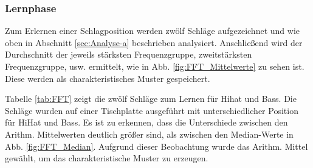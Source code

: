 \subsubsection{Lernphase}
\label{sec:Lernphase}
Zum Erlernen einer Schlagposition werden zwölf Schläge aufgezeichnet und wie oben in Abschnitt \ref{sec:Analyse-a} beschrieben analysiert.
Anschließend wird der Durchschnitt der jeweils stärksten Frequenzgruppe, zweitstärksten Frequenzgruppe, usw. ermittelt, wie in Abb. \ref{fig:FFT_Mittelwerte} zu sehen ist. 
Diese werden als charakteristisches Muster gespeichert.

Tabelle \ref{tab:FFT} zeigt die zwölf Schläge zum Lernen für Hihat und Bass.
Die Schläge wurden auf einer Tischplatte ausgeführt mit unterschiedlicher Position für HiHat und Bass.
Es ist zu erkennen, dass die Unterschiede zwischen den Arithm. Mittelwerten deutlich größer sind, als zwischen den Median-Werte in Abb. \ref{fig:FFT_Median}. 
Aufgrund dieser Beobachtung wurde das Arithm. Mittel gewählt, um das charakteristische Muster zu erzeugen. 


